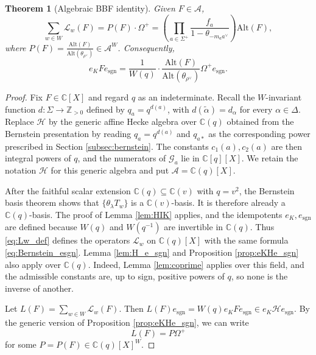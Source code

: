 \documentclass[12pt]{article}
\numberwithin{equation}{section}
\newtheorem{theorem}{Theorem}[section]
\theoremstyle{definition}
\theoremstyle{remark}
\theoremstyle{plain}
\begin{document}
\begin{theorem}[Algebraic BBF identity] \label{thm:bbf_generalized}
Given $F \in \mathcal{A}$,
\begin{equation*}
\sum_{w \in W} \mathcal{L}_{w}(F) = P(F) \cdot \Omega^{+} = \left( \prod_{a \in \Sigma^+} \frac{f_a}{1 - \theta_{-m_a a^\vee}} \right) \mathrm{Alt}(F),
\end{equation*}
where $\displaystyle P(F) = \frac{\mathrm{Alt}(F)}{ \mathrm{Alt}(\theta_{\rho^{\vee}})} \in \mathcal{A}^{W}$. Consequently,
$$e_{K}Fe_{\mathrm{sgn}} = \frac{1}{W(q)}\cdot\frac{\mathrm{Alt}(F)}{\mathrm{Alt}(\theta_{\rho^{\vee}})}\Omega^{+} e_{\mathrm{sgn}}.$$
\end{theorem}
\begin{proof}
Fix $F\in\mathbb C[X]$ and regard $q$ as an indeterminate. Recall the $W$-invariant function $d:\Sigma\to\mathbb Z_{>0}$ defined by $q_a=q^{d(a)}$, with $d(\tilde\alpha)=d_\alpha$ for every $\alpha\in\Delta$. Replace $\mathcal H$ by the generic affine Hecke algebra over $\mathbb C(q)$ obtained from the Bernstein presentation by reading $q_a=q^{d(a)}$ and $q_{a*}$ as the corresponding power prescribed in Section \ref{subsec:bernstein}. The constants $c_1(a),c_2(a)$ are then integral powers of $q$, and the numerators of $\mathcal G_a$ lie in $\mathbb C[q][X]$. We retain the notation $\mathcal H$ for this generic algebra and put $\mathcal A=\mathbb C(q)[X]$.

After the faithful scalar extension $\mathbb{C}(q)\subseteq\mathbb{C}(v)$ with $q=v^2$, the Bernstein basis theorem \cite[Proposition 3.7]{Lus89} shows that $\{\theta_\lambda T_w\}$ is a $\mathbb C(v)$-basis. It is therefore already a $\mathbb C(q)$-basis. The proof of Lemma \ref{lem:HIK} applies, and the idempotents $e_K,e_{\mathrm{sgn}}$ are defined because $W(q)$ and $W(q^{-1})$ are invertible in $\mathbb C(q)$. Thus \eqref{eq:Lw_def} defines the operators $\mathcal L_w$ on $\mathbb C(q)[X]$ with the same formula \eqref{eq:Bernstein_esgn}. Lemma \ref{lem:H_e_sgn} and Proposition \ref{prop:eKHe_sgn} also apply over $\mathbb C(q)$. Indeed, Lemma \ref{lem:coprime} applies over this field, and the admissible constants are, up to sign, positive powers of $q$, so none is the inverse of another.

Let $L(F) = \sum_{w \in W} \mathcal{L}_w(F)$. Then $L(F)e_{\mathrm{sgn}} = W(q)e_{K}Fe_{\mathrm{sgn}} \in e_{K}\mathcal{H}e_{\mathrm{sgn}}$. By the generic version of Proposition \ref{prop:eKHe_sgn}, we can write
$$L(F) = P\Omega^{+}$$
for some $P=P(F) \in \mathbb{C}(q)[X]^{W}$.


\end{proof}
\end{document}

